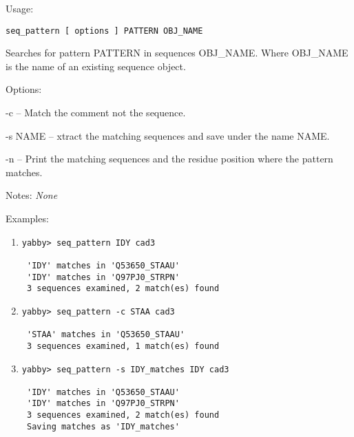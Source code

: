 \begin{description}


\item{Usage:}

{\tt seq\_pattern [ options ] PATTERN OBJ\_NAME}

Searches for pattern PATTERN in sequences OBJ\_NAME.
Where OBJ\_NAME is the name of an existing sequence object.


\item{Options:}
\begin{description}
\item -c -- Match the comment not the sequence.
\item -s NAME -- xtract the matching sequences and save under
    the name NAME.
\item -n -- Print the matching sequences and the residue position
    where the pattern matches.
\end{description}


\item{Notes:} {\em None}


\item{Examples:}
\begin{enumerate}

\item
\begin{verbatim}
yabby> seq_pattern IDY cad3

 'IDY' matches in 'Q53650_STAAU'
 'IDY' matches in 'Q97PJ0_STRPN'
 3 sequences examined, 2 match(es) found

\end{verbatim}

\item
\begin{verbatim}
yabby> seq_pattern -c STAA cad3

 'STAA' matches in 'Q53650_STAAU'
 3 sequences examined, 1 match(es) found

\end{verbatim}

\item
\begin{verbatim}
yabby> seq_pattern -s IDY_matches IDY cad3

 'IDY' matches in 'Q53650_STAAU'
 'IDY' matches in 'Q97PJ0_STRPN'
 3 sequences examined, 2 match(es) found
 Saving matches as 'IDY_matches'


\end{verbatim}
\end{enumerate}
\end{description}
